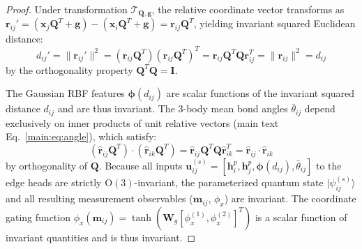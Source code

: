 \documentclass[10pt,twocolumn,letterpaper]{article}
\begin{document}
\begin{proof}
Under transformation $\mathcal{T}_{\mathbf{Q}, \mathbf{g}}$, the relative coordinate vector transforms as $\mathbf{r}_{ij}' = (\mathbf{x}_j\mathbf{Q}^T + \mathbf{g}) - (\mathbf{x}_i\mathbf{Q}^T + \mathbf{g}) = \mathbf{r}_{ij}\mathbf{Q}^T$, yielding invariant squared Euclidean distance:
\begin{equation}
    d_{ij}' = \|\mathbf{r}_{ij}'\|^2 = (\mathbf{r}_{ij}\mathbf{Q}^T)(\mathbf{r}_{ij}\mathbf{Q}^T)^T = \mathbf{r}_{ij}\mathbf{Q}^T\mathbf{Q}\mathbf{r}_{ij}^T = \|\mathbf{r}_{ij}\|^2 = d_{ij}
\end{equation}
by the orthogonality property $\mathbf{Q}^T\mathbf{Q} = \mathbf{I}$.

The Gaussian RBF features $\boldsymbol{\phi}(d_{ij})$ are scalar functions of the invariant squared distance $d_{ij}$ and are thus invariant. The 3-body mean bond angles $\bar{\theta}_{ij}$ depend exclusively on inner products of unit relative vectors (main text Eq.~\ref{main:eq:angle}), which satisfy:
\begin{equation}
    (\hat{\mathbf{r}}_{ij}\mathbf{Q}^T) \cdot (\hat{\mathbf{r}}_{ik}\mathbf{Q}^T) = \hat{\mathbf{r}}_{ij}\mathbf{Q}^T\mathbf{Q}\hat{\mathbf{r}}_{ik}^T = \hat{\mathbf{r}}_{ij} \cdot \hat{\mathbf{r}}_{ik}
\end{equation}
by orthogonality of $\mathbf{Q}$. Because all inputs $\mathbf{u}_{ij}^{(s)} = [\mathbf{h}_i^p, \mathbf{h}_j^p, \boldsymbol{\phi}(d_{ij}), \bar{\theta}_{ij}]$ to the edge heads are strictly $\mathrm{O}(3)$-invariant, the parameterized quantum state $|\psi_{ij}^{(s)}\rangle$ and all resulting measurement observables ($\mathbf{m}_{ij}$, $\phi_x$) are invariant. The coordinate gating function $\phi_x(\mathbf{m}_{ij}) = \tanh(\mathbf{W}_g [\phi_x^{(1)}, \phi_x^{(2)}]^T)$ is a scalar function of invariant quantities and is thus invariant.


\end{proof}
\end{document}

